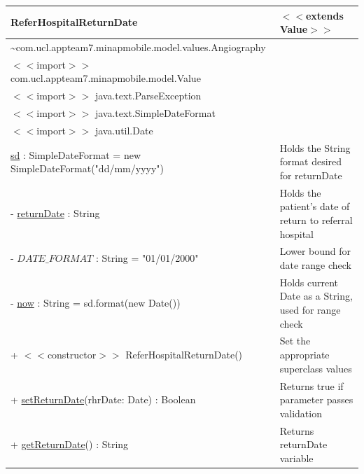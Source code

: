 \documentclass[12pt,a4paper,oneside,titlepage]{article}
\begin{document}
\begin{center}
	\begin{tabular}{| p{13cm} | p{5cm} |}
	\hline
	\textbf{ReferHospitalReturnDate} & \textbf{$<<$extends Value$>>$} \\ \hline
	\textasciitilde com.ucl.appteam7.minapmobile.model.values.Angiography	  & \\ \hline
$<<$import$>>$ com.ucl.appteam7.minapmobile.model.Value	 &  \\ \hline
$<<$import$>>$ java.text.ParseException	 &  \\ \hline
$<<$import$>>$ java.text.SimpleDateFormat	  & \\ \hline
$<<$import$>>$ java.util.Date	 &  \\ \hline \hline
\underline{sd} : SimpleDateFormat = new SimpleDateFormat("dd/mm/yyyy")	 & Holds the String format desired for returnDate \\ \hline
- \underline{returnDate} : String	 & Holds the patient's date of return to referral hospital \\ \hline
- \underline{$DATE\_FORMAT$} : String = "01/01/2000"	 & Lower bound for date range check \\ \hline
- \underline{now} : String = sd.format(new Date())	 & Holds current Date as a String, used for range check \\ \hline \hline
+ $<<$constructor$>>$ ReferHospitalReturnDate()	 & Set the appropriate superclass values \\ \hline
+ \underline{setReturnDate}(rhrDate: Date) : Boolean	 & Returns true if parameter passes validation \\ \hline
+ \underline{getReturnDate}() : String	 & Returns returnDate variable \\ \hline
	\end{tabular}
\end{center}
\end{document}
